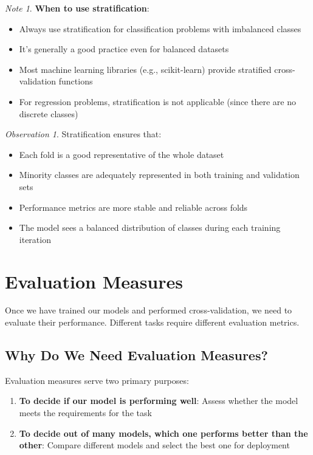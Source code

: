 \documentclass[11pt,a4paper]{article}
\theoremstyle{definition}
\theoremstyle{plain}
\theoremstyle{remark}
\newtheorem*{remark}{Note}
\newtheorem*{observation}{Observation}
\begin{document}
\begin{remark}
\textbf{When to use stratification}:
\begin{itemize}
    \item Always use stratification for classification problems with imbalanced classes
    \item It's generally a good practice even for balanced datasets
    \item Most machine learning libraries (e.g., scikit-learn) provide stratified cross-validation functions
    \item For regression problems, stratification is not applicable (since there are no discrete classes)
\end{itemize}
\end{remark}

\begin{observation}
Stratification ensures that:
\begin{itemize}
    \item Each fold is a good representative of the whole dataset
    \item Minority classes are adequately represented in both training and validation sets
    \item Performance metrics are more stable and reliable across folds
    \item The model sees a balanced distribution of classes during each training iteration
\end{itemize}
\end{observation}

\section{Evaluation Measures}

Once we have trained our models and performed cross-validation, we need to evaluate their performance. Different tasks require different evaluation metrics.

\subsection{Why Do We Need Evaluation Measures?}

Evaluation measures serve two primary purposes:

\begin{enumerate}
    \item \textbf{To decide if our model is performing well}: Assess whether the model meets the requirements for the task
    
    \item \textbf{To decide out of many models, which one performs better than the other}: Compare different models and select the best one for deployment
\end{enumerate}
\end{document}
